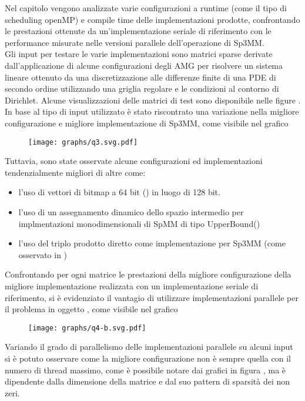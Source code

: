 Nel capitolo  vengono analizzate varie configurazioni a runtime (come il tipo di scheduling openMP) 
e compile time delle implementazioni prodotte,
confrontando le prestazioni ottenute da un'implementazione seriale di riferimento 
con le performance misurate nelle versioni parallele dell'operazione di Sp3MM.\\
Gli input per testare le varie implementazioni sono matrici sparse derivate dall'applicazione di 
alcune configurazioni degli AMG per risolvere un sistema lineare ottenuto da 
una discretizzazione alle differenze finite di una PDE di secondo ordine
utilizzando una griglia regolare e le condizioni al contorno di Dirichlet.
Alcune visualizzazioni delle matrici di test sono disponibile nelle figure  .\\
In base al tipo di input utilizzato è stato riscontrato una variazione nella migliore configurazione e migliore implementazione
di Sp3MM, come visibile nel grafico 
\begin{figure}[H]	
  \centering \texttt{[image: graphs/q3.svg.pdf]}
\end{figure}
Tuttavia, sono state osservate alcune configurazioni ed implementazioni tendenzialmente migliori di altre come:
\begin{itemize}
	\item	l'uso di vettori di bitmap a 64 bit () in luogo di 128 bit.
	\item	l'uso di un assegnamento dinamico dello spazio intermedio per implmentazioni monodimensionali di SpMM di tipo UpperBound()
	\item	l'uso del triplo prodotto diretto come implementazione per Sp3MM (come osservato in )
\end{itemize}
Confrontando per ogni matrice le prestazioni della migliore configurazione della migliore implementazione realizzata
con un implementazione seriale di riferimento, si è evidenziato il vantagio di utilizzare implementazioni parallele per il problema in oggetto
, come visibile nel grafico 
\begin{figure}[H]
  \centering \texttt{[image: graphs/q4-b.svg.pdf]}
\end{figure}

Variando il grado di parallelismo delle implementazioni parallele su alcuni input si è potuto
osservare come la migliore configurazione non è sempre quella con il numero di thread massimo, 
come è possibile notare dai grafici in figura ,
ma è dipendente dalla dimensione della matrice e dal suo pattern di sparsità dei non zeri.
